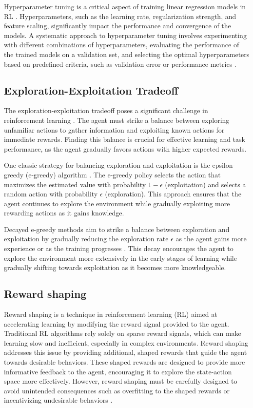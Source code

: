 Hyperparameter tuning is a critical aspect of training linear regression models in RL \cite{bergstra2012random}. Hyperparameters, such as the learning rate, regularization strength, and feature scaling, significantly impact the performance and convergence of the models. A systematic approach to hyperparameter tuning involves experimenting with different combinations of hyperparameters, evaluating the performance of the trained models on a validation set, and selecting the optimal hyperparameters based on predefined criteria, such as validation error or performance metrics \cite{russel2020ai}.

\subsection{Exploration-Exploitation Tradeoff}

The exploration-exploitation tradeoff poses a significant challenge in reinforcement learning \cite{sutton2018reinforcement}. The agent must strike a balance between exploring unfamiliar actions to gather information and exploiting known actions for immediate rewards. Finding this balance is crucial for effective learning and task performance, as the agent gradually favors actions with higher expected rewards.

One classic strategy for balancing exploration and exploitation is the epsilon-greedy (e-greedy) algorithm \cite{sutton2018reinforcement}. The e-greedy policy selects the action that maximizes the estimated value with probability $1 - \epsilon$ (exploitation) and selects a random action with probability $\epsilon$ (exploration). This approach ensures that the agent continues to explore the environment while gradually exploiting more rewarding actions as it gains knowledge.

Decayed e-greedy methods aim to strike a balance between exploration and exploitation by gradually reducing the exploration rate $\epsilon$ as the agent gains more experience or as the training progresses \cite{sutton2018reinforcement}. This decay encourages the agent to explore the environment more extensively in the early stages of learning while gradually shifting towards exploitation as it becomes more knowledgeable.

\subsection{Reward shaping}

Reward shaping is a technique in reinforcement learning (RL) aimed at accelerating learning by modifying the reward signal provided to the agent. Traditional RL algorithms rely solely on sparse reward signals, which can make learning slow and inefficient, especially in complex environments. Reward shaping addresses this issue by providing additional, shaped rewards that guide the agent towards desirable behaviors. These shaped rewards are designed to provide more informative feedback to the agent, encouraging it to explore the state-action space more effectively. However, reward shaping must be carefully designed to avoid unintended consequences such as overfitting to the shaped rewards or incentivizing undesirable behaviors \cite{russel2020ai}.

